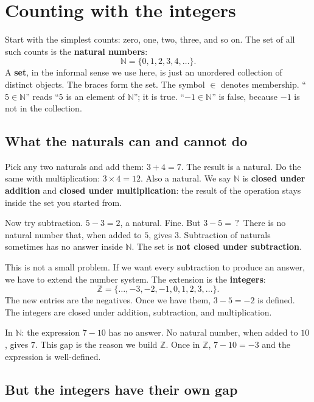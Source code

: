 \section{Counting with the integers}

Start with the simplest counts: zero, one, two, three, and so on. The set of all such counts is the \textbf{natural numbers}:
\[
  \mathbb{N} = \{0, 1, 2, 3, 4, \ldots\}.
\]
A \textbf{set}, in the informal sense we use here, is just an unordered collection of distinct objects. The braces form the set. The symbol $\in$ denotes membership. ``$5 \in \mathbb{N}$'' reads ``$5$ is an element of $\mathbb{N}$''; it is true. ``$-1 \in \mathbb{N}$'' is false, because $-1$ is not in the collection.

\subsection*{What the naturals can and cannot do}

Pick any two naturals and add them: $3 + 4 = 7$. The result is a natural. Do the same with multiplication: $3 \times 4 = 12$. Also a natural. We say $\mathbb{N}$ is \textbf{closed under addition} and \textbf{closed under multiplication}: the result of the operation stays inside the set you started from.

Now try subtraction. $5 - 3 = 2$, a natural. Fine. But $3 - 5 = \,?\,$ There is no natural number that, when added to $5$, gives $3$. Subtraction of naturals sometimes has no answer inside $\mathbb{N}$. The set is \textbf{not closed under subtraction}.

This is not a small problem. If we want every subtraction to produce an answer, we have to extend the number system. The extension is the \textbf{integers}:
\[
  \mathbb{Z} = \{\ldots, -3, -2, -1, 0, 1, 2, 3, \ldots\}.
\]
The new entries are the negatives. Once we have them, $3 - 5 = -2$ is defined. The integers are closed under addition, subtraction, and multiplication.

\begin{example}
In $\mathbb{N}$: the expression $7 - 10$ has no answer. No natural number, when added to $10$, gives $7$. This gap is the reason we build $\mathbb{Z}$. Once in $\mathbb{Z}$, $7 - 10 = -3$ and the expression is well-defined.
\end{example}

\subsection*{But the integers have their own gap}

